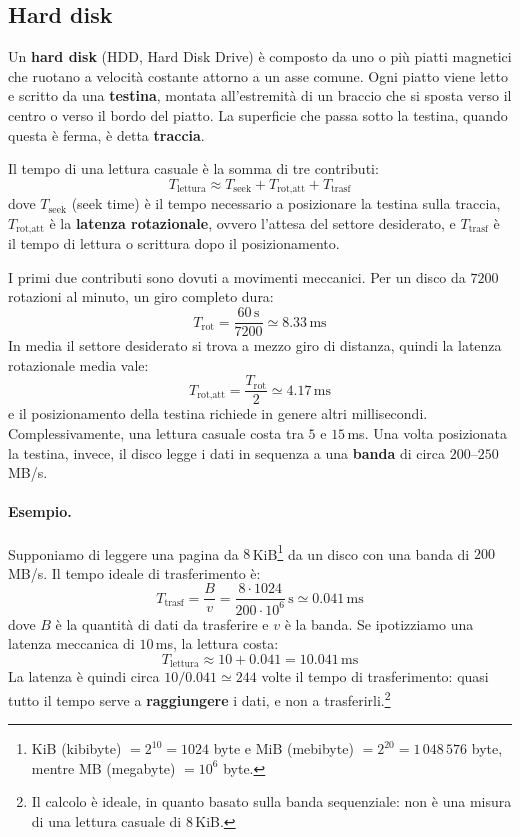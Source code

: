 \subsection{Hard disk}
Un \textbf{hard disk} (HDD, Hard Disk Drive) è composto da uno o più piatti magnetici che ruotano a velocità costante attorno a un asse comune. Ogni piatto viene letto e scritto da una \textbf{testina}, montata all'estremità di un braccio che si sposta verso il centro o verso il bordo del piatto. La superficie che passa sotto la testina, quando questa è ferma, è detta \textbf{traccia}.

Il tempo di una lettura casuale è la somma di tre contributi:
\[
T_{\text{lettura}} \approx T_{\text{seek}} + T_{\text{rot,att}} + T_{\text{trasf}}
\]
dove $T_{\text{seek}}$ (seek time) è il tempo necessario a posizionare la testina sulla traccia, $T_{\text{rot,att}}$ è la \textbf{latenza rotazionale}, ovvero l'attesa del settore desiderato, e $T_{\text{trasf}}$ è il tempo di lettura o scrittura dopo il posizionamento.

I primi due contributi sono dovuti a movimenti meccanici. Per un disco da $7200$ rotazioni al minuto, un giro completo dura:
\[
T_{\text{rot}} = \frac{60\,\text{s}}{7200} \simeq 8.33\,\text{ms}
\]
In media il settore desiderato si trova a mezzo giro di distanza, quindi la latenza rotazionale media vale:
\[
T_{\text{rot,att}} = \frac{T_{\text{rot}}}{2} \simeq 4.17\,\text{ms}
\]
e il posizionamento della testina richiede in genere altri millisecondi. Complessivamente, una lettura casuale costa tra $5$ e $15$\,ms. Una volta posizionata la testina, invece, il disco legge i dati in sequenza a una \textbf{banda} di circa $200$--$250$\,MB/s.

\paragraph{Esempio.}
Supponiamo di leggere una pagina da $8$\,KiB\footnote{KiB (kibibyte) $= 2^{10} = 1024$ byte e MiB (mebibyte) $= 2^{20} = 1\,048\,576$ byte, mentre MB (megabyte) $= 10^6$ byte.} da un disco con una banda di $200$\,MB/s. Il tempo ideale di trasferimento è:
\[
T_{\text{trasf}} = \frac{B}{v} = \frac{8 \cdot 1024}{200 \cdot 10^6}\,\text{s} \simeq 0.041\,\text{ms}
\]
dove $B$ è la quantità di dati da trasferire e $v$ è la banda. Se ipotizziamo una latenza meccanica di $10$\,ms, la lettura costa:
\[
T_{\text{lettura}} \approx 10 + 0.041 = 10.041\,\text{ms}
\]
La latenza è quindi circa $10/0.041 \simeq 244$ volte il tempo di trasferimento: quasi tutto il tempo serve a \textbf{raggiungere} i dati, e non a trasferirli.\footnote{Il calcolo è ideale, in quanto basato sulla banda sequenziale: non è una misura di una lettura casuale di $8$\,KiB.}

